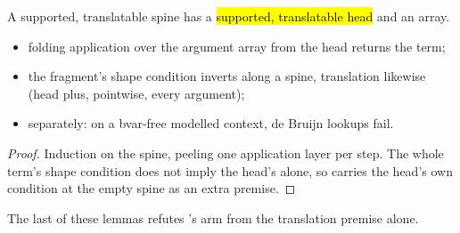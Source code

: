 \begin{lemma}
\label{lem:spine_facts}
\leanok
{}
 A supported, translatable spine has a \hl{supported, translatable head} and an
 array.
\begin{itemize}
\item folding application over the argument array from the head returns the term;
\item the fragment's shape condition inverts along a spine, translation likewise (head plus, pointwise,
every argument);
\item separately: on a bvar-free modelled context, de Bruijn lookups fail.
\end{itemize}
\end{lemma}
\begin{proof}
\leanok
{}
 Induction on the spine, peeling one application layer per step. The whole term's shape
condition does not imply the head's alone, so  carries the head's own condition at the
empty spine as an extra premise.
\end{proof}

\begin{remark}
 The last of these lemmas refutes 's  arm from the
translation premise alone.
\end{remark}

